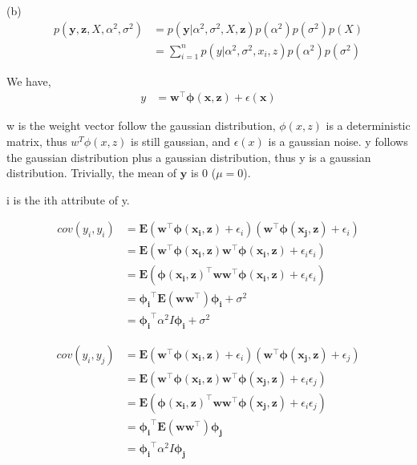 \documentclass[11pt]{article}
\newcommand{\expec}{\ensuremath{\mathbf{E}}}
\newcommand{\mbf}[1]{{\boldsymbol{\mathbf{#1}}}}
\renewcommand{\bm}{\mbf}
\begin{document}
\begin{enumerate}
(b)
\begin{align} 
    p(\bm{y}, \bm{z}, X, \alpha^2, \sigma^2) &= p(\bm{y} | \alpha^2, \sigma^2, X,\bm{z}) p(\alpha^2) p(\sigma ^2) p(X) \\
    &= \sum_{i=1}^{n} p(y | \alpha^2, \sigma^2, x_i, z) p(\alpha^2) p(\sigma ^2)
\end{align}


We have,
\begin{align}
    y &= \bm{w}^{\top} \bm{\phi}(\bm{x},\bm{z}) + \epsilon(\bm{x})   
\end{align}

w is the weight vector follow the gaussian distribution, $\phi(x, z)$ is a deterministic matrix, thus $w^T \phi(x,z)$ is still gaussian, and $\epsilon(x)$ is a gaussian noise. y follows the gaussian distribution plus a gaussian distribution, thus y is a gaussian distribution. Trivially, the mean of $\bm{y}$ is 0 ($\mu=0$).

i is the ith attribute of y.

\begin{align}
    cov(y_i, y_i) 
    &= \expec ( \bm{w}^{\top} \bm{\phi}(\bm{x_i},\bm{z}) + \epsilon_i)  ( \bm{w}^{\top} \bm{\phi}(\bm{x_j},\bm{z}) + \epsilon_i) \\
    &= \expec ( \bm{w}^{\top} \bm{\phi}(\bm{x_i},\bm{z}) \bm{w}^{\top} \bm{\phi}(\bm{x_i},\bm{z}) + \epsilon_i \epsilon_i) \\
    &= \expec ( \bm{\phi}(\bm{x_i},\bm{z})^\top \bm{w}  \bm{w}^{\top} \bm{\phi}(\bm{x_i},\bm{z}) + \epsilon_i \epsilon_i) \\
    &= \bm{\phi_i}^\top \expec (  \bm{w}  \bm{w}^{\top} ) \bm{\phi_i} + \sigma^2 \\
    &= \bm{\phi_i}^\top \alpha^2 I  \bm{\phi_i} + \sigma^2
\end{align}

\begin{align}
    cov(y_i, y_j) 
    &= \expec ( \bm{w}^{\top} \bm{\phi}(\bm{x_i},\bm{z}) + \epsilon_i)  ( \bm{w}^{\top} \bm{\phi}(\bm{x_j},\bm{z}) + \epsilon_j) \\
    &= \expec ( \bm{w}^{\top} \bm{\phi}(\bm{x_i},\bm{z}) \bm{w}^{\top} \bm{\phi}(\bm{x_j},\bm{z}) + \epsilon_i \epsilon_j) \\
    &= \expec ( \bm{\phi}(\bm{x_i},\bm{z})^\top \bm{w}  \bm{w}^{\top} \bm{\phi}(\bm{x_j},\bm{z}) + \epsilon_i \epsilon_j) \\
    &= \bm{\phi_i}^\top \expec (  \bm{w}  \bm{w}^{\top} ) \bm{\phi_j}  \\
    &= \bm{\phi_i}^\top \alpha^2 I  \bm{\phi_j} 
\end{align}



\end{enumerate}
\end{document}
